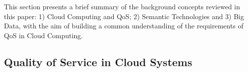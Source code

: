 This section presents a brief summary of the background concepts reviewed in this paper: 
1) Cloud Computing and QoS; 2) Semantic Technologies and 3) Big Data, with the 
aim of building a common understanding of the requirements of QoS in Cloud Computing.


\subsection{Quality of Service in Cloud Systems}\label{qos-cloud-index}


